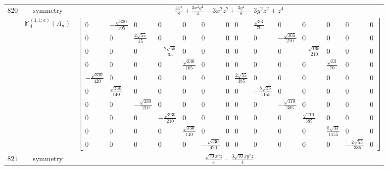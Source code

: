 \documentclass[fleqn,8pt,landscape]{jsarticle}
\begin{document}
\begin{longtable}{ccc}
$ 820 $ & $ \text{symmetry} $ & $ \frac{3 x^{4}}{8} + \frac{3 x^{2} y^{2}}{4} - 3 x^{2} z^{2} + \frac{3 y^{4}}{8} - 3 y^{2} z^{2} + z^{4} $ \\
$  $ & $ \mathbb{M}_{4}^{(1,1;a)}(A_{u}) $ & $ \begin{bmatrix} 0 & - \frac{\sqrt{330}}{105} & 0 & 0 & 0 & 0 & 0 & 0 & \frac{\sqrt{33}}{70} & 0 & 0 & 0 & 0 & 0 \\ 0 & 0 & \frac{2 \sqrt{55}}{35} & 0 & 0 & 0 & 0 & 0 & 0 & - \frac{\sqrt{165}}{210} & 0 & 0 & 0 & 0 \\ 0 & 0 & 0 & - \frac{2 \sqrt{55}}{35} & 0 & 0 & 0 & 0 & 0 & 0 & - \frac{\sqrt{165}}{210} & 0 & 0 & 0 \\ 0 & 0 & 0 & 0 & \frac{\sqrt{330}}{105} & 0 & 0 & 0 & 0 & 0 & 0 & \frac{\sqrt{33}}{70} & 0 & 0 \\ - \frac{\sqrt{330}}{420} & 0 & 0 & 0 & 0 & 0 & 0 & \frac{2 \sqrt{55}}{385} & 0 & 0 & 0 & 0 & 0 & 0 \\ 0 & \frac{\sqrt{330}}{140} & 0 & 0 & 0 & 0 & 0 & 0 & - \frac{8 \sqrt{33}}{1155} & 0 & 0 & 0 & 0 & 0 \\ 0 & 0 & - \frac{\sqrt{330}}{210} & 0 & 0 & 0 & 0 & 0 & 0 & - \frac{\sqrt{110}}{385} & 0 & 0 & 0 & 0 \\ 0 & 0 & 0 & - \frac{\sqrt{330}}{210} & 0 & 0 & 0 & 0 & 0 & 0 & \frac{\sqrt{110}}{385} & 0 & 0 & 0 \\ 0 & 0 & 0 & 0 & \frac{\sqrt{330}}{140} & 0 & 0 & 0 & 0 & 0 & 0 & \frac{8 \sqrt{33}}{1155} & 0 & 0 \\ 0 & 0 & 0 & 0 & 0 & - \frac{\sqrt{330}}{420} & 0 & 0 & 0 & 0 & 0 & 0 & - \frac{2 \sqrt{55}}{385} & 0 \end{bmatrix} $ \\ \hline
$ 821 $ & $ \text{symmetry} $ & $ \frac{\sqrt{70} x^{3} z}{4} - \frac{3 \sqrt{70} x y^{2} z}{4} $ \\

\end{longtable}
\end{document}
